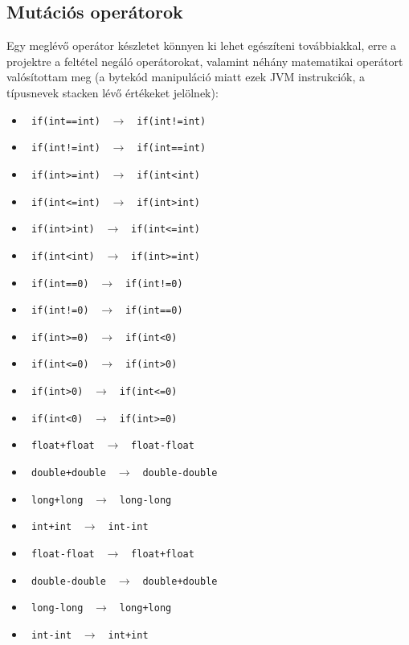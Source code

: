 \subsection{Mutációs operátorok}
Egy meglévő operátor készletet könnyen ki lehet egészíteni továbbiakkal, erre a projektre a feltétel negáló operátorokat, valamint néhány matematikai operátort valósítottam meg (a bytekód manipuláció miatt ezek JVM instrukciók, a típusnevek stacken lévő értékeket jelölnek):
\begin{itemize}
  \item \lstinline{ if(int==int) } $ \rightarrow $ \lstinline{ if(int!=int) }
  \item \lstinline{ if(int!=int) } $ \rightarrow $ \lstinline{ if(int==int) }
  \item \lstinline{ if(int>=int) } $ \rightarrow $ \lstinline{ if(int<int) }
  \item \lstinline{ if(int<=int) } $ \rightarrow $ \lstinline{ if(int>int) }
  \item \lstinline{ if(int>int) } $ \rightarrow $ \lstinline{ if(int<=int) }
  \item \lstinline{ if(int<int) } $ \rightarrow $ \lstinline{ if(int>=int) }
  \item \lstinline{ if(int==0) } $ \rightarrow $ \lstinline{ if(int!=0) }
  \item \lstinline{ if(int!=0) } $ \rightarrow $ \lstinline{ if(int==0) }
  \item \lstinline{ if(int>=0) } $ \rightarrow $ \lstinline{ if(int<0) }
  \item \lstinline{ if(int<=0) } $ \rightarrow $ \lstinline{ if(int>0) }
  \item \lstinline{ if(int>0) } $ \rightarrow $ \lstinline{ if(int<=0) }
  \item \lstinline{ if(int<0) } $ \rightarrow $ \lstinline{ if(int>=0) }
  \item \lstinline{ float+float } $ \rightarrow $ \lstinline{ float-float }
  \item \lstinline{ double+double } $ \rightarrow $ \lstinline{ double-double }
  \item \lstinline{ long+long } $ \rightarrow $ \lstinline{ long-long }
  \item \lstinline{ int+int } $ \rightarrow $ \lstinline{ int-int }
  \item \lstinline{ float-float } $ \rightarrow $ \lstinline{ float+float }
  \item \lstinline{ double-double } $ \rightarrow $ \lstinline{ double+double }
  \item \lstinline{ long-long } $ \rightarrow $ \lstinline{ long+long }
  \item \lstinline{ int-int } $ \rightarrow $ \lstinline{ int+int }
\end{itemize}
